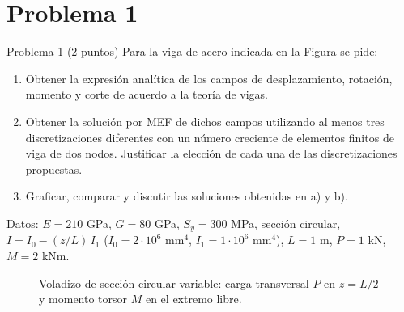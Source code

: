 \section*{Problema 1}

\begin{enunciado}{Problema 1 (2 puntos)}
    Para la viga de acero indicada en la Figura se pide:
    \begin{enumerate}[label=\alph*), itemsep=4pt]
        \item Obtener la expresión analítica de los campos de desplazamiento,
        rotación, momento y corte de acuerdo a la teoría de vigas.
        \item Obtener la solución por MEF de dichos campos utilizando al menos
        tres discretizaciones diferentes con un número creciente de elementos
        finitos de viga de dos nodos. Justificar la elección de cada una de las
        discretizaciones propuestas.
        \item Graficar, comparar y discutir las soluciones obtenidas en a) y b).
    \end{enumerate}

    \medskip
    \noindent Datos: $E = 210$ GPa, $G = 80$ GPa, $S_y = 300$ MPa, sección
    circular, $I = I_0 - (z/L)\,I_1$ ($I_0 = 2\cdot 10^6$ mm$^4$,
    $I_1 = 1\cdot 10^6$ mm$^4$), $L = 1$ m, $P = 1$ kN, $M = 2$ kNm.
\end{enunciado}

\begin{figure}[!htbp]
\centering
{}
\caption{Voladizo de sección circular variable: carga transversal $P$ en
$z=L/2$ y momento torsor $M$ en el extremo libre.}
\label{fig:t2-p1}
\end{figure}

